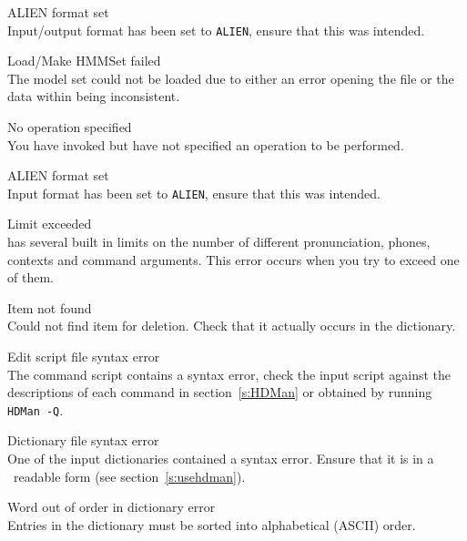\begin{itemize}
\begin{itemize}
    ALIEN format set\\
        Input/output format has been set to \texttt{ALIEN}, ensure that 
        this was intended.

\end{itemize}


\begin{itemize}
    Load/Make HMMSet failed\\
        The model set could not be loaded due to either an error opening the
        file or the data within being inconsistent.

 No operation specified\\
        You have invoked  but have not specified an operation 
        to be performed.

    ALIEN format set\\
        Input format has been set to \texttt{ALIEN}, ensure that this was 
        intended.

\end{itemize}


\begin{itemize}
 Limit exceeded\\
         has several built in limits on the number of different
        pronunciation, phones, contexts and command arguments.  This error 
        occurs when you try to exceed one of them.  

 Item not found\\
        Could not find item for deletion.  Check that it actually occurs in the
        dictionary.

 Edit script file syntax error\\
        The  command script contains a syntax error, check the 
        input script against the descriptions of each command in 
        section~\ref{s:HDMan} or obtained by running \texttt{HDMan -Q}.

 Dictionary file syntax error\\
        One of the input dictionaries contained a syntax error.  Ensure that 
        it is in a \HTK\ readable form (see section~\ref{s:usehdman}).

 Word out of order in dictionary error\\
        Entries in the dictionary must be sorted into alphabetical (ASCII) order.


\end{itemize}
\end{itemize}

